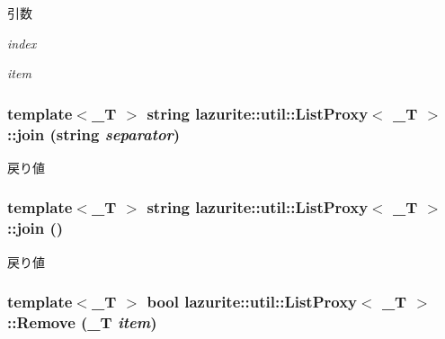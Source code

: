 \begin{DoxyParams}{引数}
\item[{\em index}]\item[{\em item}]\end{DoxyParams}
\hypertarget{classlazurite_1_1util_1_1_list_proxy_3_01___t_01_4_aa74c472acda80df78ac5a789a4411bc8}{
\subsubsection[{join}]{\setlength{\rightskip}{0pt plus 5cm}template$<$\_\-T $>$ string lazurite::util::ListProxy$<$ \_\-T $>$::join (string {\em separator})}}
\label{classlazurite_1_1util_1_1_list_proxy_3_01___t_01_4_aa74c472acda80df78ac5a789a4411bc8}
\begin{DoxyReturn}{戻り値}

\end{DoxyReturn}
\hypertarget{classlazurite_1_1util_1_1_list_proxy_3_01___t_01_4_adeb7b242424d19bf4bf0b597d94469bf}{
\subsubsection[{join}]{\setlength{\rightskip}{0pt plus 5cm}template$<$\_\-T $>$ string lazurite::util::ListProxy$<$ \_\-T $>$::join ()}}
\label{classlazurite_1_1util_1_1_list_proxy_3_01___t_01_4_adeb7b242424d19bf4bf0b597d94469bf}
\begin{DoxyReturn}{戻り値}

\end{DoxyReturn}
\hypertarget{classlazurite_1_1util_1_1_list_proxy_3_01___t_01_4_aa8bce69fce5b6e29c47febe85dbc1af1}{
\subsubsection[{Remove}]{\setlength{\rightskip}{0pt plus 5cm}template$<$\_\-T $>$ bool lazurite::util::ListProxy$<$ \_\-T $>$::Remove (\_\-T {\em item})}}
\label{classlazurite_1_1util_1_1_list_proxy_3_01___t_01_4_aa8bce69fce5b6e29c47febe85dbc1af1}

